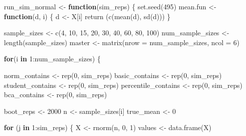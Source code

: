 \documentclass[12pt]{article}
\newenvironment{Shaded}{\begin{snugshade}}{\end{snugshade}}
\newcommand{\AttributeTok}[1]{\textcolor[rgb]{0.77,0.63,0.00}{#1}}
\newcommand{\ControlFlowTok}[1]{\textcolor[rgb]{0.13,0.29,0.53}{\textbf{#1}}}
\newcommand{\DecValTok}[1]{\textcolor[rgb]{0.00,0.00,0.81}{#1}}
\newcommand{\FunctionTok}[1]{\textcolor[rgb]{0.00,0.00,0.00}{#1}}
\newcommand{\NormalTok}[1]{#1}
\newcommand{\OtherTok}[1]{\textcolor[rgb]{0.56,0.35,0.01}{#1}}
\newcommand{\SpecialCharTok}[1]{\textcolor[rgb]{0.00,0.00,0.00}{#1}}
\begin{document}
\begin{Shaded}
\begin{Highlighting}[]
\NormalTok{run\_sim\_normal }\OtherTok{\textless{}{-}} \ControlFlowTok{function}\NormalTok{(sim\_reps) \{}
  \FunctionTok{set.seed}\NormalTok{(}\DecValTok{495}\NormalTok{)}
\NormalTok{  mean.fun }\OtherTok{\textless{}{-}} \ControlFlowTok{function}\NormalTok{(d, i) \{}
\NormalTok{    d }\OtherTok{\textless{}{-}}\NormalTok{ X[i]}
    \FunctionTok{return}\NormalTok{ (}\FunctionTok{c}\NormalTok{(}\FunctionTok{mean}\NormalTok{(d), }\FunctionTok{sd}\NormalTok{(d)))}
\NormalTok{  \}}
  
\NormalTok{  sample\_sizes }\OtherTok{\textless{}{-}} \FunctionTok{c}\NormalTok{(}\DecValTok{4}\NormalTok{, }\DecValTok{10}\NormalTok{, }\DecValTok{15}\NormalTok{, }\DecValTok{20}\NormalTok{, }\DecValTok{30}\NormalTok{, }\DecValTok{40}\NormalTok{, }\DecValTok{60}\NormalTok{, }\DecValTok{80}\NormalTok{, }\DecValTok{100}\NormalTok{)}
\NormalTok{  num\_sample\_sizes }\OtherTok{\textless{}{-}} \FunctionTok{length}\NormalTok{(sample\_sizes)}
\NormalTok{  master }\OtherTok{\textless{}{-}} \FunctionTok{matrix}\NormalTok{(}\AttributeTok{nrow =}\NormalTok{ num\_sample\_sizes, }\AttributeTok{ncol =} \DecValTok{6}\NormalTok{)}
  
  \ControlFlowTok{for}\NormalTok{(i }\ControlFlowTok{in} \DecValTok{1}\SpecialCharTok{:}\NormalTok{num\_sample\_sizes) \{}
  
\NormalTok{    norm\_contains }\OtherTok{\textless{}{-}} \FunctionTok{rep}\NormalTok{(}\DecValTok{0}\NormalTok{, sim\_reps)}
\NormalTok{    basic\_contains }\OtherTok{\textless{}{-}} \FunctionTok{rep}\NormalTok{(}\DecValTok{0}\NormalTok{, sim\_reps)}
\NormalTok{    student\_contains }\OtherTok{\textless{}{-}} \FunctionTok{rep}\NormalTok{(}\DecValTok{0}\NormalTok{, sim\_reps)}
\NormalTok{    percentile\_contains }\OtherTok{\textless{}{-}} \FunctionTok{rep}\NormalTok{(}\DecValTok{0}\NormalTok{, sim\_reps)}
\NormalTok{    bca\_contains }\OtherTok{\textless{}{-}} \FunctionTok{rep}\NormalTok{(}\DecValTok{0}\NormalTok{, sim\_reps)}
    
\NormalTok{    boot\_reps }\OtherTok{\textless{}{-}} \DecValTok{2000}
\NormalTok{    n }\OtherTok{\textless{}{-}}\NormalTok{ sample\_sizes[i]}
\NormalTok{    true\_mean }\OtherTok{\textless{}{-}} \DecValTok{0}
    
    \ControlFlowTok{for}\NormalTok{ (j }\ControlFlowTok{in} \DecValTok{1}\SpecialCharTok{:}\NormalTok{sim\_reps) \{}
\NormalTok{      X }\OtherTok{\textless{}{-}} \FunctionTok{rnorm}\NormalTok{(n, }\DecValTok{0}\NormalTok{, }\DecValTok{1}\NormalTok{)}
\NormalTok{      values }\OtherTok{\textless{}{-}} \FunctionTok{data.frame}\NormalTok{(X)}
    

\end{Highlighting}
\end{Shaded}
\end{document}
